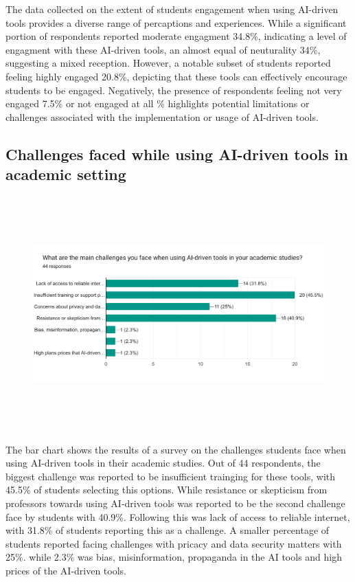 The data collected on the extent of students engagement when using AI-driven tools
provides a diverse range of percaptions and experiences. While a significant portion
of respondents reported moderate engagment 34.8\%, indicating a level of engagment with
these AI-driven tools, an almost equal of neuturality 34\%, suggesting a mixed reception.
However, a notable subset of students reported feeling highly engaged 20.8\%, depicting that
these tools can effectively encourage students to be engaged. Negatively, the presence
of respondents feeling not very engaged 7.5\% or not engaged at all \% highlights potential
limitations or challenges associated with the implementation or usage of AI-driven tools.


\subsection{Challenges faced while using AI-driven tools in academic setting}

\begin{figure}[H]
	\centering
	\includegraphics[width=17cm, height=9cm]{./chap4/figures/chall}
\end{figure}

The bar chart shows the results of a survey on the challenges students
face when using AI-driven tools in their academic studies. Out of 44 respondents,
the biggest challenge was reported to be insufficient trainging for these
tools, with 45.5\% of students selecting this options. While resistance or skepticism
from professors towards using AI-driven tools was reported to be the second challenge
face by students with 40.9\%.
Following this was lack of access to reliable internet, with 31.8\% of students
reporting this as a challenge.
A smaller percentage of students reported facing challenges with pricacy and data security matters
with 25\%. while 2.3\% was bias, misinformation, propaganda in the AI tools and high prices of the AI-driven tools.

